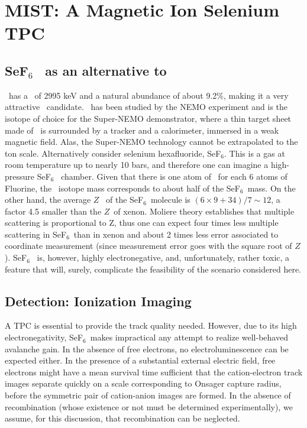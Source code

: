 \section{MIST: A Magnetic Ion Selenium TPC}
\subsection{SeF$_6$~ as an alternative to \XE}

\SE\ has a \Qbb\ of 2995 keV and a natural abundance of about 9.2\%, making it a very attractive \bbonu\ candidate.  \SE\ has been studied by the NEMO experiment and is the isotope of choice for the Super-NEMO demonstrator, where a thin target sheet made of \SE\ is surrounded by a tracker and a calorimeter, immersed in a weak magnetic field. Alas, the Super-NEMO technology cannot be extrapolated to the ton scale. Alternatively consider selenium hexafluoride, SeF$_6$. This is a gas at room temperature up to nearly 10 bars, and therefore one can imagine a high-pressure SeF$_6$~ chamber. Given that there is one atom of \SE\ for each 6 atoms of Fluorine, the \SE\ isotope mass corresponds to about half of the SeF$_6$~mass. On the other hand, the average $Z$~ of the SeF$_6$~molecule is $(6 \times 9 + 34)/7 \sim12$, a factor 4.5 smaller than the $Z$~of xenon. Moliere  theory establishes that multiple scattering is proportional to Z, thus one can expect four times less multiple scattering in SeF$_6$~than in xenon and about 2 times less error associated to coordinate measurement (since measurement error goes with the square root of $Z$).  SeF$_6$~ is, however, highly electronegative, and, unfortunately, rather toxic, a feature that will, surely, complicate the feasibility of the scenario considered here.

\subsection{Detection: Ionization Imaging}

A TPC is essential to provide the track quality needed. However, due to its high electronegativity, SeF$_6$~makes impractical any attempt to realize well-behaved avalanche gain. In the absence of free electrons, no electroluminescence can be expected either.  In the presence of a substantial external electric field, free electrons might have a mean survival time sufficient that the cation-electron track images separate quickly on a scale corresponding to Onsager capture radius, before the symmetric pair of cation-anion images are formed. In the absence of recombination (whose existence or not must be determined experimentally), we assume, for this discussion, that recombination can be neglected.  

